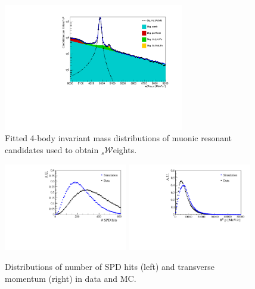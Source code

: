  \begin{figure}[h!]
\centering
\includegraphics[width=0.7\textwidth]{RKst/figs/sW/KstJPsMM_log.pdf}
\caption{Fitted 4-body invariant mass distributions of muonic resonant candidates used to obtain $_s\mathcal{W}$eights.}
\label{fig:RKst_sW_mass}
\end{figure}

\begin{figure}[h!]
\centering
\includegraphics[width=0.48\textwidth]{RKst/figs/nspd_12.pdf}
\includegraphics[width=0.48\textwidth]{RKst/figs/bpt.pdf}
\caption{Distributions of number of SPD hits (left) and \Bz transverse momentum (right) in data and MC.}
\label{fig:b0pt_nSPD_distrib}
\end{figure}

